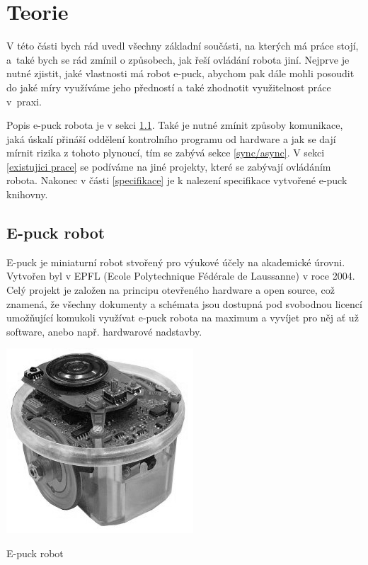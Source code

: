 \chapter{Teorie}
\label{chap:teorie}

    V této části bych rád uvedl všechny základní součásti, na kterých má práce
    stojí, a~také bych se rád zmínil o způsobech, jak řeší ovládání robota
    jiní. Nejprve je nutné zjistit, jaké vlastnosti má robot e-puck, abychom
    pak dále mohli posoudit do jaké míry využíváme jeho předností a také
    zhodnotit využitelnost práce v~praxi.

    Popis e-puck robota je v sekci \ref{e-puck robot}. Také je nutné zmínit
    způsoby komunikace, jaká úskalí přináší oddělení kontrolního programu od
    hardware a jak se dají mírnit rizika z tohoto plynoucí, tím se zabývá sekce
    \ref{sync/async}. V sekci \ref{existujici prace} se podíváme na jiné
    projekty, které se zabývají ovládáním robota. Nakonec v části
    \ref{specifikace} je k nalezení specifikace vytvořené e-puck knihovny.

    \section{E-puck robot}
    \label{e-puck robot}
    E-puck je miniaturní robot stvořený pro výukové účely na akademické úrovni.
    Vytvořen byl v EPFL (Ecole Polytechnique Fédérale de Laussanne) v roce
    2004. Celý projekt je založen na principu otevřeného hardware a open
    source, což znamená, že všechny dokumenty a schémata jsou dostupná pod
    svobodnou licencí umožňující komukoli využívat e-puck robota na maximum a
    vyvíjet pro něj ať už software, anebo např. hardwarové nadstavby.

    \renewcommand\listingscaption{Obrázek}
    \begin{listing}
        \begin{center}
            \includegraphics[scale=0.5]{e-puck.jpg}
            \caption{E-puck robot}
        \end{center}
    \end{listing}
    \renewcommand\listingscaption{Zdrojový kód}

